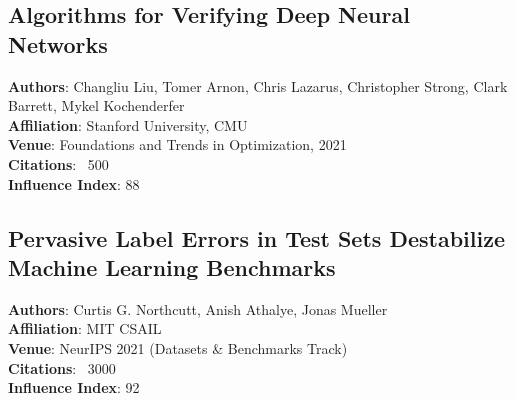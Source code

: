 \documentclass[12pt,a4paper]{article}
\begin{document}
\subsection{Algorithms for Verifying Deep Neural Networks}

\textbf{Authors}: Changliu Liu, Tomer Arnon, Chris Lazarus, Christopher Strong, Clark Barrett, Mykel Kochenderfer \\
\textbf{Affiliation}: Stanford University, CMU \\
\textbf{Venue}: Foundations and Trends in Optimization, 2021 \\
\textbf{Citations}: ~500 \\
\textbf{Influence Index}: 88

\begin{abstract}
This survey classifies existing verification methods under a unified mathematical framework: reachability analysis, optimization-based methods, and search-based approaches. The paper provides pedagogical implementations and compares methods on benchmark problems.
\end{abstract}

\subsection{Pervasive Label Errors in Test Sets Destabilize Machine Learning Benchmarks}

\textbf{Authors}: Curtis G. Northcutt, Anish Athalye, Jonas Mueller \\
\textbf{Affiliation}: MIT CSAIL \\
\textbf{Venue}: NeurIPS 2021 (Datasets \& Benchmarks Track) \\
\textbf{Citations}: ~3000 \\
\textbf{Influence Index}: 92
\end{document}
